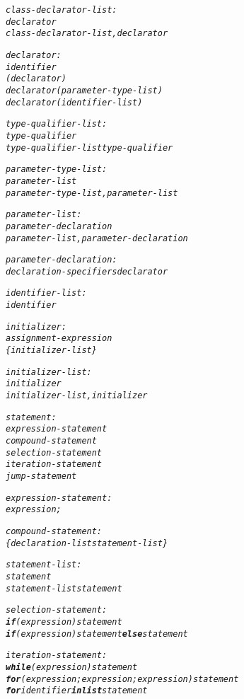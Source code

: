 \documentclass[12pt]{report}
\begin{document}
\begin{alltt}
     \textit{class-declarator-list:}
          \textit{declarator}
          \textit{class-declarator-list, declarator}
          
     \textit{declarator:}
          \textit{identifier}
          \textit{( declarator )}
          \textit{declarator ( parameter-type-list )}
          \textit{declarator ( identifier-list )}
          
     \textit{type-qualifier-list:}
          \textit{type-qualifier}
          \textit{type-qualifier-list type-qualifier}
          
     \textit{parameter-type-list:}
          \textit{parameter-list}
          \textit{parameter-type-list , parameter-list}
          
     \textit{parameter-list:}
          \textit{parameter-declaration}
          \textit{parameter-list , parameter-declaration}
          
     \textit{parameter-declaration:}
          \textit{declaration-specifiers declarator}
          
     \textit{identifier-list:}
          \textit{identifier}
          
     \textit{initializer:}
          \textit{assignment-expression}
          \textit{\{ initializer-list \}}
          
     \textit{initializer-list:}
          \textit{initializer}
          \textit{initializer-list , initializer}
          
     \textit{statement:}
          \textit{expression-statement}
          \textit{compound-statement}
          \textit{selection-statement}
          \textit{iteration-statement}
          \textit{jump-statement}
          
     \textit{expression-statement:}
          \textit{expression;}
          
     \textit{compound-statement:}
          \textit{\{ declaration-list statement-list \}}
          
     \textit{statement-list:}
          \textit{statement}
          \textit{statement-list statement}
          
     \textit{selection-statement:}
          \textit{\textbf{if} (expression) statement}
          \textit{\textbf{if} (expression) statement \textbf{else} statement}
          
     \textit{iteration-statement:}
          \textit{\textbf{while} (expression) statement}
          \textit{\textbf{for} (expression; expression; expression) statement}
          \textit{\textbf{for} identifier \textbf{in list} statement}
          

\end{alltt}
\end{document}
